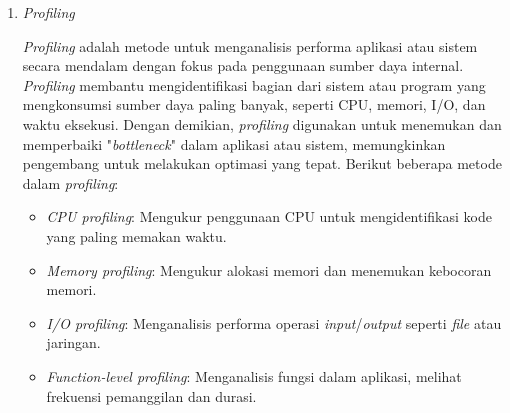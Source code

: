 \documentclass[12pt]{article}
\begin{document}
\begin{enumerate}
\begin{enumerate}
            \item \textit{Profiling}
            \par \textit{Profiling} adalah metode untuk menganalisis performa aplikasi atau sistem secara mendalam dengan fokus pada penggunaan sumber daya internal\cite{3.2.4Altvater2023}. \textit{Profiling} membantu mengidentifikasi bagian dari sistem atau program yang mengkonsumsi sumber daya paling banyak, seperti CPU, memori, I/O, dan waktu eksekusi. Dengan demikian, \textit{profiling} digunakan untuk menemukan dan memperbaiki "\textit{bottleneck}" dalam aplikasi atau sistem, memungkinkan pengembang untuk melakukan optimasi yang tepat. Berikut beberapa metode dalam \textit{profiling}:
            \begin{itemize}
                \item \textit{CPU profiling}: Mengukur penggunaan CPU untuk mengidentifikasi kode yang paling memakan waktu.
                \item \textit{Memory profiling}: Mengukur alokasi memori dan menemukan kebocoran memori. 
                \item \textit{I/O profiling}: Menganalisis performa operasi \textit{input}/\textit{output} seperti \textit{file} atau jaringan.
                \item \textit{Function-level profiling}: Menganalisis fungsi dalam aplikasi, melihat frekuensi pemanggilan dan durasi.
            \end{itemize}
            

\end{enumerate}
\end{enumerate}
\end{document}
